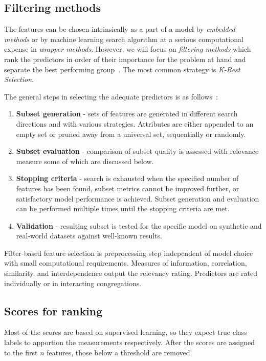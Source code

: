 \subsection{Filtering methods}
The features can be chosen intrinsically as a part of a model by \emph{embedded methods} or by machine learning search algorithm at a serious computational expense in \emph{wrapper methods}. However, we will focus on \emph{filtering methods} which rank the predictors in order of their importance for the problem at hand and separate the best performing group~\cite{johnson_feature_2019}. The most common strategy is \emph{K-Best Selection}.

The general steps in selecting the adequate predictors is as follows~\cite{nandi_condition_2019}:
\begin{enumerate}
    \itemsep0pt
    \item \textbf{Subset generation} - sets of features are generated in different search directions and with various strategies. Attributes are either appended to an empty set or pruned away from a universal set, sequentially or randomly.
    \item \textbf{Subset evaluation} - comparison of subset quality is assessed with relevance measure some of which are discussed below.
    \item \textbf{Stopping criteria} - search is exhausted when the specified number of features has been found, subset metrics cannot be improved further, or satisfactory model performance is achieved. Subset generation and evaluation can be performed multiple times until the stopping criteria are met.
    \item \textbf{Validation} - resulting subset is tested for the specific model on synthetic and real-world datasets against well-known results. 
\end{enumerate}

Filter-based feature selection is preprocessing step independent of model choice with small computational requirements. Measures of information, correlation, similarity, and interdependence output the relevancy rating. Predictors are rated individually or in interacting congregations. 

\subsection{Scores for ranking}
Most of the scores are based on supervised learning, so they expect true class labels to apportion the measurements respectively. After the scores are assigned to the first $n$ features, those below a threshold are removed. 

